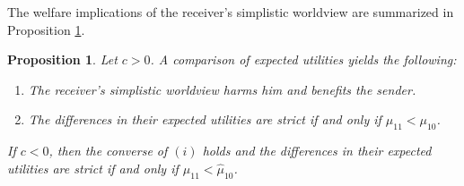 \documentclass[12pt,english]{article}
\newtheorem{proposition}{Proposition}
\theoremstyle{plain}
\begin{document}

The welfare implications of the receiver's simplistic worldview are summarized in Proposition \ref{pr:main}.
\begin{proposition}\label{pr:main}
Let $c>0$.
A comparison of expected utilities yields the following:  
\begin{enumerate}[label=(\roman*)]
    \item The receiver's simplistic worldview harms him and benefits the sender.
    \item The differences in their expected utilities are strict if and only if $\mu_{11}<\mu_{10}$.
\end{enumerate}
If $c<0$, then the converse of $(i)$ holds and the differences in their expected utilities are strict if and only if $\hat\mu_{11}<\hat\mu_{10}$.
\end{proposition}

\end{document}
